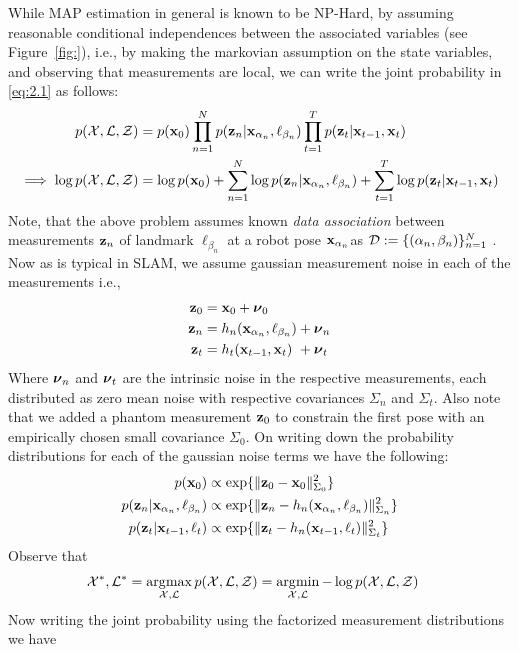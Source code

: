 While MAP estimation in general is known to be NP-Hard, by assuming reasonable conditional independences between the associated variables (see Figure~\ref{fig:}), i.e., by making the markovian assumption on the state variables, and observing that measurements are local, we can write the joint probability in \ref{eq:2.1} as follows:
\begin{align}
    p(\mathcal{X}, \mathcal{L}, \mathcal{Z}) &= p(\mathbf{x}_0) \prod_{n=1}^{N} p(\mathbf{z}_n | \mathbf{x}_{\alpha_n}, \ell_{\beta_n}) \prod_{t=1}^{T} p(\mathbf{z}_t | \mathbf{x}_{t-1}, \mathbf{x}_{t})\nonumber\\
    \implies \log p(\mathcal{X}, \mathcal{L}, \mathcal{Z}) &= \log p(\mathbf{x}_0) + \sum_{n=1}^{N} \log p(\mathbf{z}_n | \mathbf{x}_{\alpha_n}, \ell_{\beta_n}) + \sum_{t=1}^{T} \log p(\mathbf{z}_t | \mathbf{x}_{t-1}, \mathbf{x}_{t})
\end{align}
Note, that the above problem assumes known \emph{data association} between measurements $\mathbf{z}_n$ of landmark $\ell_{\beta_n}$ at a robot pose $\mathbf{x}_{\alpha_n}$as $\mathcal{D} := \{(\alpha_n, \beta_n)\}_{n=1}^{N}$ \cite{bowmanProbabilisticDataAssociation2017}.
Now as is typical in SLAM, we assume gaussian measurement noise in each of the measurements i.e.,
\begin{align*}
    \mathbf{z}_0 &= \mathbf{x}_0 + \boldsymbol \nu_0\\
    \mathbf{z}_n &= h_n(\mathbf{x}_{\alpha_n}, \ell_{\beta_n}) + \boldsymbol \nu_n\\
    \mathbf{z}_t &= h_t(\mathbf{x}_{t-1}, \mathbf{x}_t) ~+ \boldsymbol \nu_t
\end{align*}
Where $\boldsymbol \nu_n$ and $\boldsymbol \nu_t$ are the intrinsic noise in the respective measurements, each distributed as zero mean noise with respective covariances $\Sigma_n$ and $\Sigma_t$. Also note that we added a phantom measurement $\mathbf{z}_0$ to constrain the first pose with an empirically chosen small covariance $\Sigma_0$. On writing down the probability distributions for each of the gaussian noise terms we have the following:
\begin{align*}
    p(\mathbf{x}_0) &\propto \exp\{ \|\mathbf{z}_0 - \mathbf{x}_0\|^2_{\Sigma_0}\}\\
    p(\mathbf{z}_n | \mathbf{x}_{\alpha_n}, \ell_{\beta_n}) &\propto \exp\{ \|\mathbf{z}_n - h_n(\mathbf{x}_{\alpha_n}, \ell_{\beta_n})\|^2_{\Sigma_n}\}\\
    p(\mathbf{z}_t | \mathbf{x}_{t-1}, \ell_{t}) &\propto \exp\{ \|\mathbf{z}_t - h_n(\mathbf{x}_{t-1}, \ell_{t})\|^2_{\Sigma_t}\}
\end{align*}
Observe that
\begin{align*}
    \mathcal{X}^*, \mathcal{L}^* &= \operatorname*{\arg\!\max}_{\mathcal{X}, \mathcal{L}} p(\mathcal{X}, \mathcal{L}, \mathcal{Z}) = \operatorname*{\arg\!\min}_{\mathcal{X}, \mathcal{L}} - \log p(\mathcal{X}, \mathcal{L}, \mathcal{Z})
\end{align*}
Now writing the joint probability using the factorized measurement distributions we have
